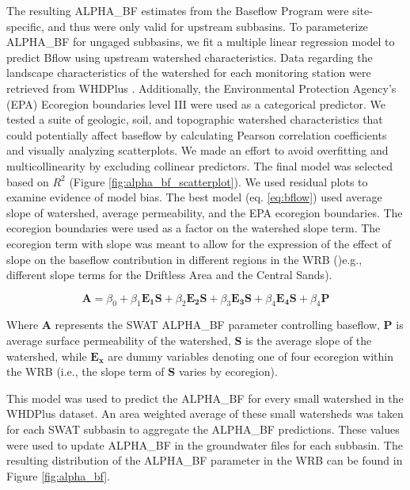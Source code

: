 	The resulting ALPHA\_BF estimates from the Baseflow Program were site-specific, and thus were only valid for upstream subbasins. To parameterize ALPHA\_BF for ungaged subbasins, we fit a multiple linear regression model to predict Bflow using upstream watershed characteristics. 
	Data regarding the landscape characteristics of the watershed for each monitoring station were retrieved from WHDPlus \citep{wdnr_whdplus_2013}.
	Additionally, the Environmental Protection Agency's (EPA) Ecoregion boundaries level III were used as a categorical predictor. 
	We tested a suite of geologic, soil, and topographic watershed characteristics that could potentially affect baseflow by calculating Pearson correlation coefficients and visually analyzing scatterplots.
	We made an effort to avoid overfitting and multicollinearity by excluding collinear predictors. The final model was selected based on $R^2$ (Figure \ref{fig:alpha_bf_scatterplot}). 
	We used residual plots to examine evidence of model bias. 
	The best model (eq. \ref{eq:bflow}) used average slope of watershed, average permeability, and the EPA ecoregion boundaries. The ecoregion boundaries were used as a factor on the watershed slope term. 
	The ecoregion term with slope was meant to allow for the expression of the effect of slope on the baseflow contribution in different regions in the WRB ()e.g., different slope terms for the Driftless Area and the Central Sands).

	\begin{equation}
	\bm{A} = \beta_0 + 
		\beta_1 \bm{E_1} \bm{S} +
		\beta_2 \bm{E_2} \bm{S} + 
		\beta_3 \bm{E_3} \bm{S} +
		\beta_4 \bm{E_4} \bm{S} +
		\beta_4 \bm{P}
		\label{eq:bflow}
	\end{equation}
	
	Where $\bm{A}$ represents the SWAT ALPHA\_BF parameter controlling baseflow, $\bm{P}$ is average surface permeability of the watershed, $\bm{S}$ is the average slope of the watershed, while $\bm{E_x}$ are dummy variables denoting one of four ecoregion within the WRB (i.e., the slope term of $\bm{S}$ varies by ecoregion).
	
	This model was used to predict the ALPHA\_BF for every small watershed in the WHDPlus dataset. An area weighted average of these small watersheds was taken for each SWAT subbasin to aggregate the ALPHA\_BF predictions. These values were used to update ALPHA\_BF in the groundwater files for each subbasin. The resulting distribution of the ALPHA\_BF parameter in the WRB can be found in Figure \ref{fig:alpha_bf}.
	